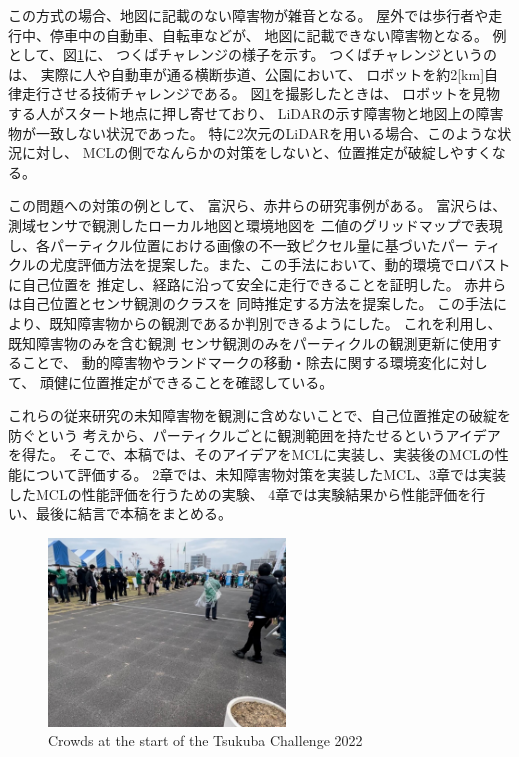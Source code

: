 \documentclass{jarticle}
\begin{document}
この方式の場合、地図に記載のない障害物が雑音となる。
屋外では歩行者や走行中、停車中の自動車、自転車などが、
地図に記載できない障害物となる。
例として、図\ref{fig: つくばチャレンジ人混み}に、
つくばチャレンジ\cite{つくばチャレンジ}の様子を示す。
つくばチャレンジというのは、
実際に人や自動車が通る横断歩道、公園において、
ロボットを約2[km]自律走行させる技術チャレンジである。
図\ref{fig: つくばチャレンジ人混み}を撮影したときは、
ロボットを見物する人がスタート地点に押し寄せており、
LiDARの示す障害物と地図上の障害物が一致しない状況であった。
特に2次元のLiDARを用いる場合、このような状況に対し、
MCLの側でなんらかの対策をしないと、位置推定が破綻しやすくなる。

この問題への対策の例として、
富沢ら\cite{富沢2012}、赤井ら\cite{赤井2019}の研究事例がある。
富沢ら\cite{富沢2012}は、測域センサで観測したローカル地図と環境地図を
二値のグリッドマップで表現し、各パーティクル位置における画像の不一致ピクセル量に基づいたパー
ティクルの尤度評価方法を提案した。また、この手法において、動的環境でロバストに自己位置を
推定し、経路に沿って安全に走行できることを証明した。
赤井ら\cite{赤井2019}は自己位置とセンサ観測のクラスを
同時推定する方法を提案した。
この手法により、既知障害物からの観測であるか判別できるようにした。
これを利用し、既知障害物のみを含む観測
センサ観測のみをパーティクルの観測更新に使用することで、
動的障害物やランドマークの移動・除去に関する環境変化に対して、
頑健に位置推定ができることを確認している。

これらの従来研究の未知障害物を観測に含めないことで、自己位置推定の破綻を防ぐという
考えから、パーティクルごとに観測範囲を持たせるというアイデアを得た。
そこで、本稿では、そのアイデアをMCLに実装し、実装後のMCLの性能について評価する。
2章では、未知障害物対策を実装したMCL、3章では実装したMCLの性能評価を行うための実験、
4章では実験結果から性能評価を行い、最後に結言で本稿をまとめる。

\begin{figure}[h!]
  \centering
   \includegraphics[height=50mm]{fig/hitogomi.png}
   \vspace*{-4mm}
   \caption{Crowds at the start of the Tsukuba Challenge 2022}
   \label{fig: つくばチャレンジ人混み}
 \end{figure}
\end{document}
